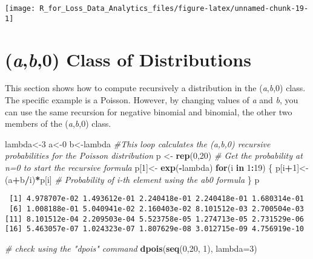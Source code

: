 \documentclass[]{book}
\newenvironment{Shaded}{\begin{snugshade}}{\end{snugshade}}
\newcommand{\KeywordTok}[1]{\textcolor[rgb]{0.13,0.29,0.53}{\textbf{#1}}}
\newcommand{\DataTypeTok}[1]{\textcolor[rgb]{0.13,0.29,0.53}{#1}}
\newcommand{\DecValTok}[1]{\textcolor[rgb]{0.00,0.00,0.81}{#1}}
\newcommand{\StringTok}[1]{\textcolor[rgb]{0.31,0.60,0.02}{#1}}
\newcommand{\CommentTok}[1]{\textcolor[rgb]{0.56,0.35,0.01}{\textit{#1}}}
\newcommand{\ControlFlowTok}[1]{\textcolor[rgb]{0.13,0.29,0.53}{\textbf{#1}}}
\newcommand{\OperatorTok}[1]{\textcolor[rgb]{0.81,0.36,0.00}{\textbf{#1}}}
\newcommand{\NormalTok}[1]{#1}
\theoremstyle{definition}
\theoremstyle{definition}
\theoremstyle{definition}
\theoremstyle{remark}
\begin{document}
\begin{center}\texttt{[image: R\_for\_Loss\_Data\_Analytics\_files/figure-latex/unnamed-chunk-19-1]} \end{center}

\section{\texorpdfstring{(\emph{a},\emph{b},0) Class of
Distributions}{(a,b,0) Class of Distributions}}\label{ab0-class-of-distributions}

This section shows how to compute recursively a distribution in the
(\emph{a},\emph{b},0) class. The specific example is a Poisson. However,
by changing values of \emph{a} and \emph{b}, you can use the same
recursion for negative binomial and binomial, the other two members of
the (\emph{a},\emph{b},0) class.

\begin{Shaded}
\begin{Highlighting}[]
\NormalTok{lambda<-}\DecValTok{3}
\NormalTok{a<-}\DecValTok{0}
\NormalTok{b<-lambda}
\CommentTok{#This loop calculates the (a,b,0) recursive probabilities for the Poisson distribution}
\NormalTok{p <-}\StringTok{ }\KeywordTok{rep}\NormalTok{(}\DecValTok{0}\NormalTok{,}\DecValTok{20}\NormalTok{)}
\CommentTok{# Get the probability at n=0 to start the recursive formula }
\NormalTok{p[}\DecValTok{1}\NormalTok{]<-}\StringTok{ }\KeywordTok{exp}\NormalTok{(}\OperatorTok{-}\NormalTok{lambda)}
\ControlFlowTok{for}\NormalTok{(i }\ControlFlowTok{in} \DecValTok{1}\OperatorTok{:}\DecValTok{19}\NormalTok{)}
\NormalTok{  \{}
\NormalTok{  p[i}\OperatorTok{+}\DecValTok{1}\NormalTok{]<-(a}\OperatorTok{+}\NormalTok{b}\OperatorTok{/}\NormalTok{i)}\OperatorTok{*}\NormalTok{p[i]         }\CommentTok{# Probability of i-th element using the ab0 formula}
\NormalTok{  \}}
\NormalTok{p}
\end{Highlighting}
\end{Shaded}

\begin{verbatim}
 [1] 4.978707e-02 1.493612e-01 2.240418e-01 2.240418e-01 1.680314e-01
 [6] 1.008188e-01 5.040941e-02 2.160403e-02 8.101512e-03 2.700504e-03
[11] 8.101512e-04 2.209503e-04 5.523758e-05 1.274713e-05 2.731529e-06
[16] 5.463057e-07 1.024323e-07 1.807629e-08 3.012715e-09 4.756919e-10
\end{verbatim}

\begin{Shaded}
\begin{Highlighting}[]
\CommentTok{# check using the "dpois" command}
\KeywordTok{dpois}\NormalTok{(}\KeywordTok{seq}\NormalTok{(}\DecValTok{0}\NormalTok{,}\DecValTok{20}\NormalTok{, }\DecValTok{1}\NormalTok{), }\DataTypeTok{lambda=}\DecValTok{3}\NormalTok{)}
\end{Highlighting}
\end{Shaded}
\end{document}
